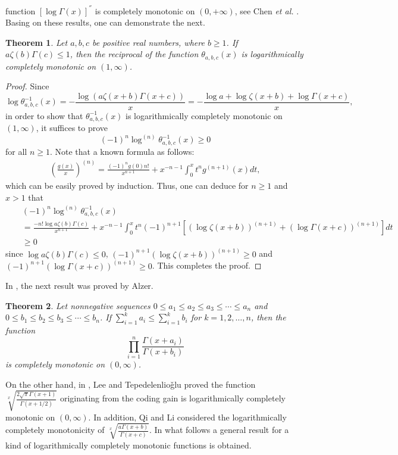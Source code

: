 \documentclass[12pt,reqno]{article}
\newtheorem{thm}{Theorem}[section]
\theoremstyle{definition}
\numberwithin{equation}{section}
\begin{document}
function $[\log\Gamma(x)]^{''}$ is completely monotonic on
$(0,+\infty)$, see Chen {\it et al.} \cite{CGW1}. Basing on these
results, one can demonstrate the next.
\begin{thm}
Let $a,b,c$ be positive real numbers, where $b\geq 1$. If
$a\zeta(b)\Gamma(c)\leq1$, then the reciprocal of the function
$\theta_{a,b,c}(x)$ is logarithmically completely monotonic on
$(1,\infty)$.
\end{thm}
\begin{proof}
Since
$$\log\theta^{-1}_{a,b,c}(x)=-\frac{\log\left(a\zeta(x+b)\Gamma(x+c)\right)}{x}=-\frac{\log
a+\log\zeta(x+b)+\log\Gamma(x+c)}{x},$$ in order to show that
$\theta^{-1}_{a,b,c}(x)$ is logarithmically completely monotonic on
$(1,\infty)$, it suffices to prove
$$(-1)^n\log^{(n)}\theta^{-1}_{a,b,c}(x)\geq0$$ for all $n\geq1$.
Note that a known formula as follows:
\begin{eqnarray}\label{eq+d}
\left(\frac{g(x)}{x}\right)^{(n)}=\frac{(-1)^ng(0)n!}{x^{n+1}}+x^{-n-1}\int_0^x
t^n g^{(n+1)}(x)dt,
\end{eqnarray}
which can be easily proved by induction. Thus, one can deduce for
$n\geq1$ and $x>1$ that
\begin{eqnarray*}
&&(-1)^n\log^{(n)}\theta^{-1}_{a,b,c}(x)\\
&&=\frac{-n!\log{a\zeta(b)\Gamma(c)}}{x^{n+1}}+x^{-n-1}\int_0^x t^n
(-1)^{n+1}\left[\left(\log\zeta(x+b)\right)^{(n+1)}+\left(\log\Gamma(x+c)\right)^{(n+1)}\right]dt\\
&&\geq0
\end{eqnarray*}
since $\log{a\zeta(b)\Gamma(c)}\leq0$,
$(-1)^{n+1}\left(\log\zeta(x+b)\right)^{(n+1)}\geq0$ and
$(-1)^{n+1}\left(\log\Gamma(x+c)\right)^{(n+1)}\geq0$.
 This completes the proof.
\end{proof}
In \cite{Al97}, the next result was proved by Alzer.
\begin{thm}\emph{\cite{Al97}}
Let nonnegative sequences $0\leq a_1\leq a_2\leq a_3\leq\cdots\leq
a_n$ and $0\leq b_1\leq b_2\leq b_3\leq\cdots\leq b_n$. If
$\sum_{i=1}^ka_i\leq \sum_{i=1}^kb_i$ for $k=1,2,\ldots,n$, then the
function $$\prod_{i=1}^n\frac{\Gamma(x+a_i)}{\Gamma(x+b_i)}$$ is
 completely monotonic on $(0,\infty)$.
\end{thm}
On the other hand, in \cite{LT11}, Lee and Tepedelenlio\v{g}lu
proved the function
$\sqrt[x]{\frac{2\sqrt{\pi}\Gamma(x+1)}{\Gamma(x+1/2)}}$ originating
from the coding gain is logarithmically completely monotonic on
$(0,\infty)$. In addition, Qi and Li \cite{QL13} considered the
logarithmically completely monotonicity of
$\sqrt[x]{\frac{a\Gamma(x+b)}{\Gamma(x+c)}}$. In what follows a
general result for a kind of logarithmically completely monotonic
functions is obtained.
\end{document}
